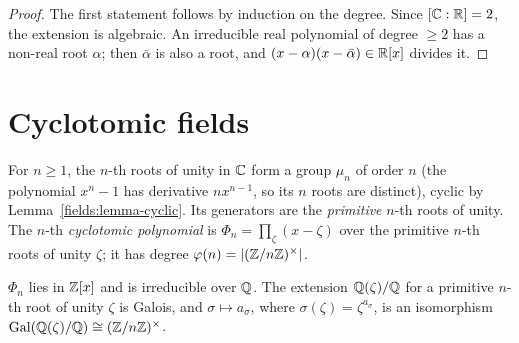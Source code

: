 \begin{proof}
The first statement follows by induction on the degree. Since $[\mathbb{C} : \mathbb{R}] = 2$, the
extension is algebraic. An irreducible real polynomial of degree $\geq 2$ has a non-real root
$\alpha$; then $\bar\alpha$ is also a root, and $(x - \alpha)(x - \bar\alpha) \in \mathbb{R}[x]$ divides it.
\end{proof}

\section{Cyclotomic fields}\label{fields:section-cyclotomic}

\begin{definition}\label{fields:definition-roots-of-unity}
For $n \geq 1$, the $n$-th roots of unity in $\mathbb{C}$ form a group $\mu_n$ of order $n$ (the polynomial
$x^n - 1$ has derivative $nx^{n-1}$, so its $n$ roots are distinct), cyclic by
Lemma~\ref{fields:lemma-cyclic}. Its generators are the \emph{primitive} $n$-th roots of unity.
The $n$-th \emph{cyclotomic polynomial} is $\Phi_n = \prod_{\zeta} (x - \zeta)$ over the primitive
$n$-th roots of unity $\zeta$; it has degree $\varphi(n) = |(\mathbb{Z}/n\mathbb{Z})^\times|$.
\end{definition}

\begin{theorem}\label{fields:theorem-cyclotomic}
$\Phi_n$ lies in $\mathbb{Z}[x]$ and is irreducible over $\mathbb{Q}$. The extension $\mathbb{Q}(\zeta)/\mathbb{Q}$ for a primitive
$n$-th root of unity $\zeta$ is Galois, and $\sigma \mapsto a_\sigma$, where $\sigma(\zeta) = \zeta^{a_\sigma}$, is an
isomorphism $\mathrm{Gal}(\mathbb{Q}(\zeta)/\mathbb{Q}) \cong (\mathbb{Z}/n\mathbb{Z})^\times$.
\end{theorem}

